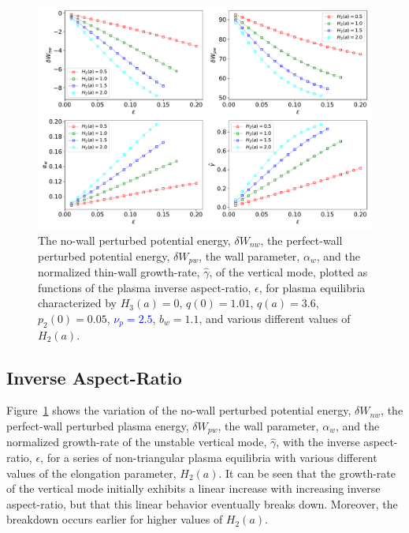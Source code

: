 \documentclass[12pt,prb,aps]{revtex4-1}
\begin{document}
\begin{figure}
\centerline{\includegraphics[width=\textwidth]{Fig3.pdf}}
\caption{The no-wall perturbed potential energy, $\delta W_{nw}$, the perfect-wall perturbed potential energy, $\delta W_{pw}$, the wall
parameter, $\alpha_w$, and the normalized thin-wall growth-rate, $\hat{\gamma}$,  of the  vertical mode, plotted as  functions of the
plasma  inverse aspect-ratio, $\epsilon$, for plasma equilibria characterized by   $H_3(a)=0$, $q(0)=1.01$, $q(a)=3.6$,  $p_2(0)=0.05$, \textcolor{blue}{$\nu_p=2.5$}, $b_w=1.1$, and
various different values of $H_2(a)$.  \label{fig3}}
\end{figure}

\subsection{Inverse Aspect-Ratio}
Figure~\ref{fig3} shows the variation of the no-wall perturbed potential energy, $\delta W_{nw}$, the perfect-wall perturbed plasma energy, $\delta W_{pw}$, the wall 
parameter, $\alpha_w$, and the normalized growth-rate of the unstable vertical mode, $\hat{\gamma}$, with the inverse
aspect-ratio, $\epsilon$, for a series of
non-triangular plasma equilibria with various different values of the elongation parameter, $H_2(a)$. It can be seen that the growth-rate of the vertical 
mode initially exhibits a linear increase with increasing inverse aspect-ratio, but that this linear behavior eventually breaks down. Moreover, the breakdown occurs
earlier for higher values of $H_2(a)$. 
\end{document}
